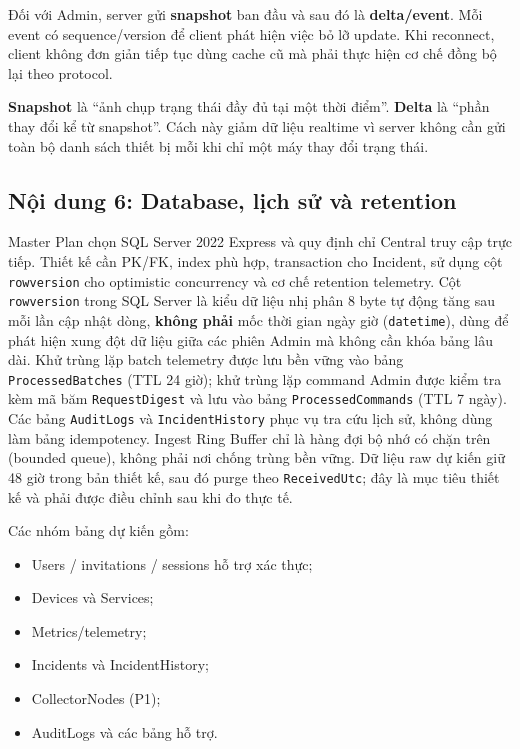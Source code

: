Đối với Admin, server gửi \textbf{snapshot} ban đầu và sau đó là \textbf{delta/event}. Mỗi event có sequence/version để client phát hiện việc bỏ lỡ update. Khi reconnect, client không đơn giản tiếp tục dùng cache cũ mà phải thực hiện cơ chế đồng bộ lại theo protocol.

\begin{beginnerbox}
\textbf{Snapshot} là ``ảnh chụp trạng thái đầy đủ tại một thời điểm''. \textbf{Delta} là ``phần thay đổi kể từ snapshot''. Cách này giảm dữ liệu realtime vì server không cần gửi toàn bộ danh sách thiết bị mỗi khi chỉ một máy thay đổi trạng thái.
\end{beginnerbox}

\subsection{Nội dung 6: Database, lịch sử và retention}

Master Plan chọn SQL Server 2022 Express \cite{mslearn_sql_express_limits} và quy định chỉ Central truy cập trực tiếp. Thiết kế cần PK/FK, index phù hợp, transaction cho Incident, sử dụng cột \texttt{rowversion} \cite{mslearn_rowversion} cho optimistic concurrency và cơ chế retention telemetry. Cột \texttt{rowversion} trong SQL Server là kiểu dữ liệu nhị phân 8 byte tự động tăng sau mỗi lần cập nhật dòng, \textbf{không phải} mốc thời gian ngày giờ (\texttt{datetime}), dùng để phát hiện xung đột dữ liệu giữa các phiên Admin mà không cần khóa bảng lâu dài. Khử trùng lặp batch telemetry được lưu bền vững vào bảng \texttt{ProcessedBatches} (TTL 24 giờ); khử trùng lặp command Admin được kiểm tra kèm mã băm \texttt{RequestDigest} và lưu vào bảng \texttt{ProcessedCommands} (TTL 7 ngày). Các bảng \texttt{AuditLogs} và \texttt{IncidentHistory} phục vụ tra cứu lịch sử, không dùng làm bảng idempotency. Ingest Ring Buffer chỉ là hàng đợi bộ nhớ có chặn trên (bounded queue), không phải nơi chống trùng bền vững. Dữ liệu raw dự kiến giữ 48 giờ trong bản thiết kế, sau đó purge theo \texttt{ReceivedUtc}; đây là mục tiêu thiết kế và phải được điều chỉnh sau khi đo thực tế.

Các nhóm bảng dự kiến gồm:
\begin{itemize}
    \item Users / invitations / sessions hỗ trợ xác thực;
    \item Devices và Services;
    \item Metrics/telemetry;
    \item Incidents và IncidentHistory;
    \item CollectorNodes (P1);
    \item AuditLogs và các bảng hỗ trợ.
\end{itemize}

